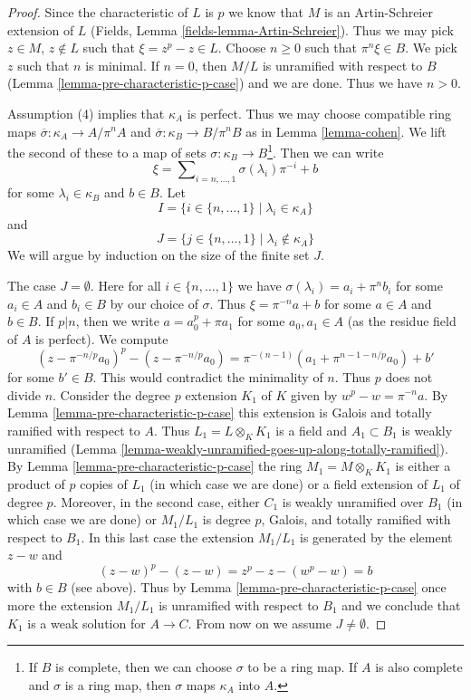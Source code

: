 \begin{proof}
Since the characteristic of $L$ is $p$ we know that $M$ is an Artin-Schreier
extension of $L$ (Fields, Lemma \ref{fields-lemma-Artin-Schreier}).
Thus we may pick $z \in M$, $z \not \in L$ such that
$\xi = z^p - z \in L$. Choose $n \geq 0$ such that $\pi^n\xi \in B$.
We pick $z$ such that $n$ is minimal. If $n = 0$, then $M/L$ is unramified
with respect to $B$ (Lemma \ref{lemma-pre-characteristic-p-case}) and
we are done. Thus we have $n > 0$.

\medskip\noindent
Assumption (4) implies that $\kappa_A$ is perfect. Thus we may
choose compatible ring maps $\overline{\sigma} : \kappa_A \to A/\pi^n A$ and
$\overline{\sigma} : \kappa_B \to B/\pi^n B$ as in
Lemma \ref{lemma-cohen}. We lift the second of these to a
map of sets $\sigma : \kappa_B \to B$\footnote{If $B$ is complete, then
we can choose $\sigma$ to be a ring map. If $A$ is also complete and
$\sigma$ is a ring map, then $\sigma$ maps $\kappa_A$ into $A$.}.
Then we can write
$$
\xi = \sum\nolimits_{i = n, \ldots, 1} \sigma(\lambda_i) \pi^{-i} + b
$$
for some $\lambda_i \in \kappa_B$ and $b \in B$. Let
$$
I = \{i \in \{n, \ldots, 1\} \mid \lambda_i \in \kappa_A\}
$$
and
$$
J = \{j \in \{n, \ldots, 1\} \mid \lambda_i \not \in \kappa_A\}
$$
We will argue by induction on the size of the finite set $J$.

\medskip\noindent
The case $J = \emptyset$. Here for all $i \in \{n, \ldots, 1\}$ we have
$\sigma(\lambda_i) = a_i + \pi^n b_i$ for some $a_i \in A$ and $b_i \in B$
by our choice of $\sigma$. Thus
$\xi = \pi^{-n} a + b$ for some $a \in A$ and $b \in B$.
If $p | n$, then we write $a = a_0^p + \pi a_1$ for some $a_0, a_1 \in A$
(as the residue field of $A$ is perfect). We compute
$$
(z - \pi^{-n/p}a_0)^p - (z - \pi^{-n/p}a_0) =
\pi^{-(n - 1)}(a_1 + \pi^{n - 1 - n/p}a_0) + b'
$$
for some $b' \in B$. This would contradict the minimality of $n$. Thus $p$
does not divide $n$. Consider the degree $p$ extension $K_1$ of $K$ given
by $w^p - w = \pi^{-n}a$. By Lemma \ref{lemma-pre-characteristic-p-case}
this extension is Galois and totally ramified with respect to $A$.
Thus $L_1 = L \otimes_K K_1$ is a field and $A_1 \subset B_1$
is weakly unramified
(Lemma \ref{lemma-weakly-unramified-goes-up-along-totally-ramified}).
By Lemma \ref{lemma-pre-characteristic-p-case}
the ring $M_1 = M \otimes_K K_1$ is either a product of $p$ copies
of $L_1$ (in which case we are done) or a field extension of $L_1$
of degree $p$. Moreover, in the second case, either $C_1$ is weakly unramified
over $B_1$ (in which case we are done) or $M_1/L_1$ is degree $p$,
Galois, and totally ramified with respect to $B_1$.
In this last case the extension $M_1/L_1$
is generated by the element $z - w$ and
$$
(z - w)^p - (z - w) = z^p - z - (w^p - w) = b
$$
with $b \in B$ (see above). Thus by Lemma \ref{lemma-pre-characteristic-p-case}
once more the extension $M_1/L_1$ is unramified with respect to $B_1$
and we conclude that $K_1$ is a weak solution for $A \to C$.
From now on we assume $J \not = \emptyset$.


\end{proof}
